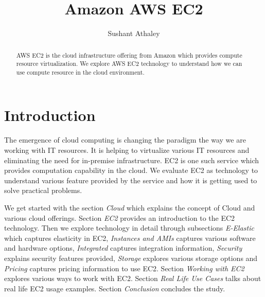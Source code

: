 
\title{Amazon AWS EC2}


\author{Sushant Athaley}

\renewcommand{\shortauthors}{G. v. Laszewski}


\begin{abstract}
AWS EC2 is the cloud infrastructure offering from Amazon which provides compute resource virtualization. We explore AWS EC2 technology to understand how we can use compute resource in the cloud environment. 

\end{abstract}


\maketitle

\section{Introduction}
The emergence of cloud computing is changing the paradigm the way we are working with IT resources. It is helping to virtualize various IT resources and eliminating the need for in-premise infrastructure. EC2 is one such service which provides computation capability in the cloud. We evaluate EC2 as technology to understand various feature provided by the service and how it is getting used to solve practical problems.

We get started with the section \emph{Cloud} which explains the concept of Cloud and various cloud offerings. Section \emph{EC2} provides an introduction to the EC2 technology. Then we explore technology in detail through subsections \emph{E-Elastic} which captures elasticity in EC2, \emph{Instances and AMIs} captures various software and hardware options, \emph{Integrated} captures integration information, \emph{Security} explains security features provided, \emph{Storage} explores various storage options and \emph{Pricing} captures pricing information to use EC2.
Section \emph{Working with EC2} explores various ways to work with EC2. Section \emph{Real Life Use Cases} talks about real life EC2 usage examples. Section \emph{Conclusion} concludes the study. 

